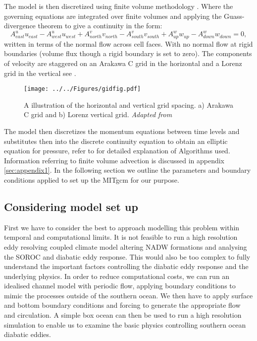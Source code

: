 The model is then discretized using finite volume methodology \citep{Adcroft1997}. Where the governing equations are integrated over finite volumes and applying the Guass-divergence theorem to give a continuity in the form:
\begin{equation}
A^{u}_{east}u_{east} - A^{u}_{west}u_{west} + A^{v}_{north}v_{north} - A^{v}_{south}v_{south} + A^{w}_{up}w_{up} - A^{w}_{down}w_{down} = 0,
\end{equation}
written in terms of the normal flow across cell faces. With no normal flow at rigid boundaries (volume flux though a rigid boundary is set to zero). The components of velocity are staggered on an Arakawa C grid \citep{Chang1997} in the horizontal and a Lorenz grid in the vertical  \citep{lorenz1960energy} see .

\begin{figure}[h]
\center
\noindent \texttt{[image: ../../Figures/gidfig.pdf]} 
\caption{A illustration of the horizontal and vertical grid spacing. a) Arakawa C grid and b) Lorenz vertical grid. \textit{Adapted from} \protect \citep{Collins2013}}
\label{fig:gridfig}
\end{figure}

The model then discretizes the momentum equations between time levels and substitutes then into the discrete continuity equation to obtain an elliptic equation for pressure, refer to \citet{jmarshall1997} for detailed explanation of Algorithms used. Information referring to finite volume advection is discussed in appendix \ref{sec:appendix1}. In the following section we outline the parameters and boundary conditions applied to set up the MITgcm for our purpose.

\subsection{Considering model set up}

First we have to consider the best to approach modelling this problem within temporal and computational limits. It is not feasible to run a high resolution eddy resolving coupled climate model altering \gls{NADW} formations and analysing the \gls{SOROC} and diabatic eddy response. This would also be too complex to fully understand the important factors controlling the diabatic eddy response and the underlying physics. In order to reduce computational costs, we can run an idealised channel model with periodic flow, applying boundary conditions to mimic the processes outside of the southern ocean. We then have to apply surface and bottom boundary conditions and forcing to generate the appropriate flow and circulation. A simple box ocean can then be used to run a high resolution simulation to enable us to examine the basic physics controlling southern ocean diabatic eddies. 

